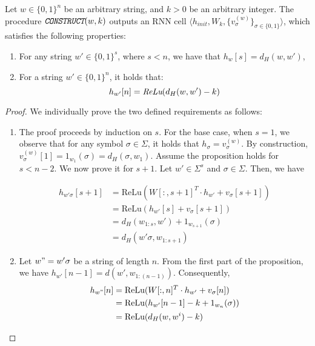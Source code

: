 \begin{proposition}\label{app:prop:reluproperties}
Let $w \in \{0,1\}^{n}$ be an arbitrary string, and $k > 0$ be an arbitrary integer. The procedure $\emph{\texttt{CONSTRUCT}}(w,k)$ outputs an RNN cell $\langle h_{init}, W_{k}, \{v_{\sigma}^{(w)}\}_{\sigma \in \{0,1\}}\rangle$, which satisfies the following properties: 
\begin{enumerate}
    \item For any string $w' \in \{0,1\}^{s}$, where $ s < n$, we have that $h_{w}[s] = d_{H}(w,w')$,
    \item For a string $w' \in \{0,1\}^{n}$, it holds that: 
\begin{equation}\label{eq:levsimulate}        
h_{w'}[n] = \emph{\text{ReLu}}(d_{H}(w, w') - k)
    \end{equation}
\end{enumerate}
\end{proposition}

\begin{proof} We individually prove the two defined requirements as follows:
\begin{enumerate}
    \item The proof proceeds by induction on $s$. For the base case, when $s = 1$, we observe that for any symbol $\sigma \in \Sigma$, it holds that $h_{\sigma} = v_{\sigma}^{(w)}$. By construction, $v_{\sigma}^{(w)}[1] = \mathrm{1}_{w_{1}}(\sigma) = d_{H}(\sigma,w_{1})$.
    Assume the proposition holds for $s < n-2$. We now prove it for $s+1$. Let $w' \in \Sigma^{s}$ and $\sigma \in \Sigma$. Then, we have
 
    \begin{align*}
    h_{w' \sigma}[s+1] &= \text{ReLu}(W[:,s+1]^{T} \cdot h_{w'} + v_{\sigma}[s+1]) \\
    &= \text{ReLu}(h_{w'}[s] + v_{\sigma}[s+1]) \\
    &= d_{H}(w_{1:s}, w') + \mathrm{1}_{w_{s+1}}( \sigma) \\
    &= d_{H}(w'\sigma, w_{1:s+1})
    \end{align*}
 
    \item Let $w" = w'\sigma$ be a string of length $n$. From the first part of the proposition, we have 
    $h_{w'}[n-1] = d(w', w_{1:(n-1)})$. Consequently,
    \begin{align*} 
    h_{w"}[n] &= \text{ReLu}(W[:,n]^{T} \cdot h_{w'} + v_{\sigma}[n]) \\
    &= \text{ReLu}(h_{w'}[n-1]  - k + \mathrm{1}_{w_{n} } (\sigma)) \\ 
    &= \text{ReLu}(d_{H}(w, w^{i}) - k)
    \end{align*}
    \end{enumerate}
\end{proof}


